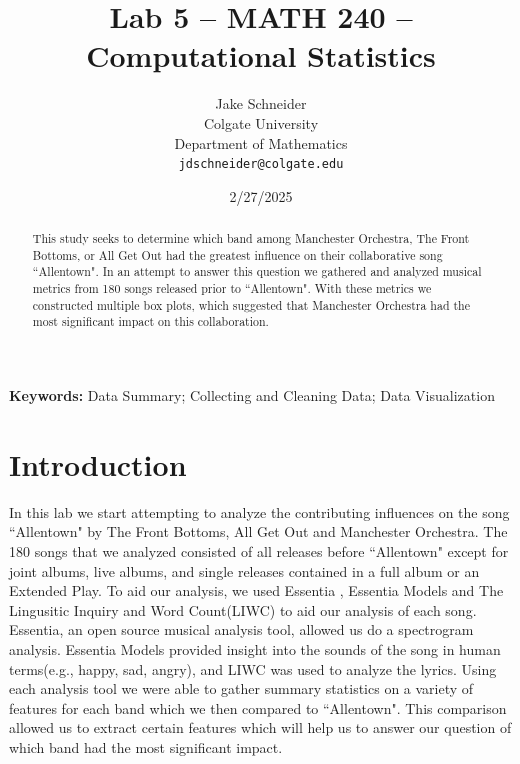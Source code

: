 \documentclass{article}\usepackage[]{graphicx}\usepackage[]{xcolor}
\begin{document}
\vspace{-1in}
\title{Lab 5 -- MATH 240 -- Computational Statistics}

\author{
  Jake Schneider \\
  Colgate University  \\
  Department of Mathematics  \\
  {\tt jdschneider@colgate.edu}
}

\date{2/27/2025}

\maketitle

\begin{multicols}{2}
\begin{abstract}
This study seeks to determine which band among Manchester Orchestra, The Front Bottoms, or All Get Out had the greatest influence on their collaborative song ``Allentown". In an attempt to answer this question we gathered and analyzed musical metrics from 180 songs released prior to ``Allentown". With these metrics we constructed multiple box plots, which suggested that Manchester Orchestra had the most significant impact on this collaboration. 

\end{abstract}

\noindent \textbf{Keywords:} Data Summary; Collecting and Cleaning Data; Data Visualization

\section{Introduction}
In this lab we start attempting to analyze the contributing influences on the song ``Allentown" by The Front Bottoms, All Get Out and Manchester Orchestra. The 180 songs that we analyzed consisted of all releases before ``Allentown" except for joint albums, live albums, and single releases contained in a full album or an Extended Play. To aid our analysis, we used Essentia \citep{essentia}, Essentia Models \citep{essentiamodels} and The Lingusitic Inquiry and Word Count(LIWC) \citep{LIWC} to aid our analysis of each song. Essentia, an open source musical analysis tool, allowed us do a spectrogram analysis. Essentia Models provided insight into the sounds of the song in human terms(e.g., happy, sad, angry), and LIWC was used to analyze the lyrics. Using each analysis tool we were able to gather summary statistics on a variety of features for each band which we then compared to ``Allentown". This comparison allowed us to extract certain features which will help us to answer our question of which band had the most significant impact. 


\end{multicols}
\end{document}
